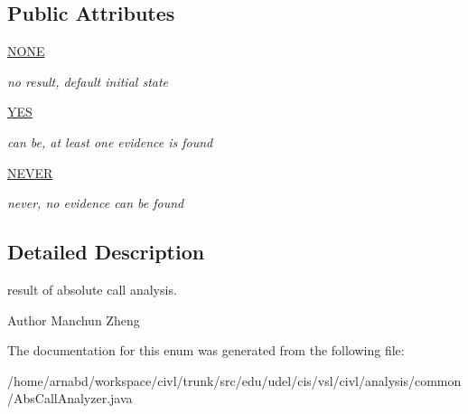 \subsection*{Public Attributes}
\begin{DoxyCompactItemize}
\item 
\hypertarget{enumedu_1_1udel_1_1cis_1_1vsl_1_1civl_1_1analysis_1_1common_1_1AbsCallAnalyzer_1_1AbsType_a1a84ff0d2ce0d2f99931b418889e8db6}{}\hyperlink{enumedu_1_1udel_1_1cis_1_1vsl_1_1civl_1_1analysis_1_1common_1_1AbsCallAnalyzer_1_1AbsType_a1a84ff0d2ce0d2f99931b418889e8db6}{N\+O\+N\+E}\label{enumedu_1_1udel_1_1cis_1_1vsl_1_1civl_1_1analysis_1_1common_1_1AbsCallAnalyzer_1_1AbsType_a1a84ff0d2ce0d2f99931b418889e8db6}

\begin{DoxyCompactList}\small\item\em no result, default initial state \end{DoxyCompactList}\item 
\hypertarget{enumedu_1_1udel_1_1cis_1_1vsl_1_1civl_1_1analysis_1_1common_1_1AbsCallAnalyzer_1_1AbsType_a9a0c8e82839946a66d8c8ff9dc60d051}{}\hyperlink{enumedu_1_1udel_1_1cis_1_1vsl_1_1civl_1_1analysis_1_1common_1_1AbsCallAnalyzer_1_1AbsType_a9a0c8e82839946a66d8c8ff9dc60d051}{Y\+E\+S}\label{enumedu_1_1udel_1_1cis_1_1vsl_1_1civl_1_1analysis_1_1common_1_1AbsCallAnalyzer_1_1AbsType_a9a0c8e82839946a66d8c8ff9dc60d051}

\begin{DoxyCompactList}\small\item\em can be, at least one evidence is found \end{DoxyCompactList}\item 
\hypertarget{enumedu_1_1udel_1_1cis_1_1vsl_1_1civl_1_1analysis_1_1common_1_1AbsCallAnalyzer_1_1AbsType_a9da358f0ac02398daf3622796d5126d4}{}\hyperlink{enumedu_1_1udel_1_1cis_1_1vsl_1_1civl_1_1analysis_1_1common_1_1AbsCallAnalyzer_1_1AbsType_a9da358f0ac02398daf3622796d5126d4}{N\+E\+V\+E\+R}\label{enumedu_1_1udel_1_1cis_1_1vsl_1_1civl_1_1analysis_1_1common_1_1AbsCallAnalyzer_1_1AbsType_a9da358f0ac02398daf3622796d5126d4}

\begin{DoxyCompactList}\small\item\em never, no evidence can be found \end{DoxyCompactList}\end{DoxyCompactItemize}


\subsection{Detailed Description}
result of absolute call analysis. 

\begin{DoxyAuthor}{Author}
Manchun Zheng 
\end{DoxyAuthor}


The documentation for this enum was generated from the following file\+:\begin{DoxyCompactItemize}
\item 
/home/arnabd/workspace/civl/trunk/src/edu/udel/cis/vsl/civl/analysis/common/Abs\+Call\+Analyzer.\+java\end{DoxyCompactItemize}
